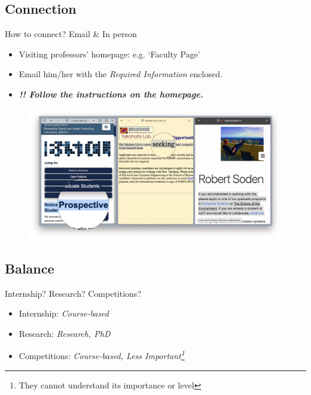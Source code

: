 \documentclass[UTF8]{beamer}
\begin{document}
\subsection{Connection}
\begin{frame}{How to connect? \hfill Email \& In person}
  \begin{itemize}
    \item Visiting professors' homepage: e.g. `Faculty Page'
    \item Email him/her with the \emph{Required Information} enclosed.
    \item \textbf{\emph{!! Follow the instructions on the homepage.}}
  \end{itemize}

  \begin{figure}[h]
    \centering
    \includegraphics[width=\linewidth]{pic/PotentialSupervisor1.png}
  \end{figure}

\end{frame}

\subsection{Balance}
\begin{frame}{Internship? \hfill Research? \hfill Competitions?}
  \begin{itemize}
    \item Internship: \hfill \emph{Course-based}
    \item Research: \hfill \emph{Research, PhD}
    \item Competitions: \hfill \emph{Course-based, Less Important\footnote{They cannot understand its importance or level}}
  \end{itemize}
\end{frame}
\end{document}
